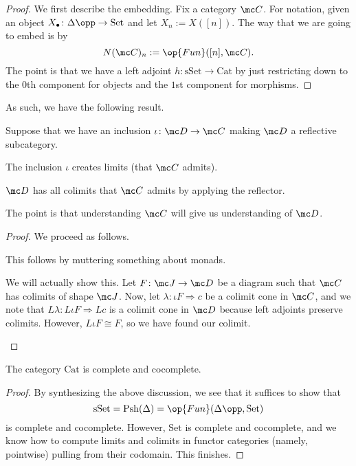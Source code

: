 \documentclass[../notes.tex]{subfiles}
\begin{document}
\begin{proof}
	We first describe the embedding. Fix a category $\mc C$. For notation, given an object $X_\bullet\colon\Delta\opp\to\mathrm{Set}$ and let $X_n:=X([n])$. The way that we are going to embed is by
	\[N(\mc C)_n:=\op{Fun}([n],\mc C).\]
	The point is that we have a left adjoint $h\colon\mathrm{sSet}\to\mathrm{Cat}$ by just restricting down to the $0$th component for objects and the $1$st component for morphisms.
\end{proof}
As such, we have the following result.
\begin{proposition}
	Suppose that we have an inclusion $\iota\colon\mc D\to\mc C$ making $\mc D$ a reflective subcategory.
	\begin{listroman}
		\item The inclusion $\iota$ creates limits (that $\mc C$ admits).
		\item $\mc D$ has all colimits that $\mc C$ admits by applying the reflector.
	\end{listroman}
\end{proposition}
The point is that understanding $\mc C$ will give us understanding of $\mc D$.
\begin{proof}
	We proceed as follows.
	\begin{listroman}
		\item This follows by muttering something about monads.
		\item We will actually show this. Let $F\colon\mc J\to\mc D$ be a diagram such that $\mc C$ has colimits of shape $\mc J$. Now, let $\lambda\colon \iota F\Rightarrow c$ be a colimit cone in $\mc C$, and we note that $L\lambda\colon L\iota F\Rightarrow Lc$ is a colimit cone in $\mc D$ because left adjoints preserve colimits. However, $L\iota F\cong F$, so we have found our colimit.
		\qedhere
	\end{listroman}
\end{proof}
\begin{corollary}
	The category $\mathrm{Cat}$ is complete and cocomplete.
\end{corollary}
\begin{proof}
	By synthesizing the above discussion, we see that it suffices to show that
	\[\mathrm{sSet}=\mathrm{Psh}(\Delta)=\op{Fun}(\Delta\opp,\mathrm{Set})\]
	is complete and cocomplete. However, $\mathrm{Set}$ is complete and cocomplete, and we know how to compute limits and colimits in functor categories (namely, pointwise) pulling from their codomain. This finishes.
\end{proof}
\end{document}
